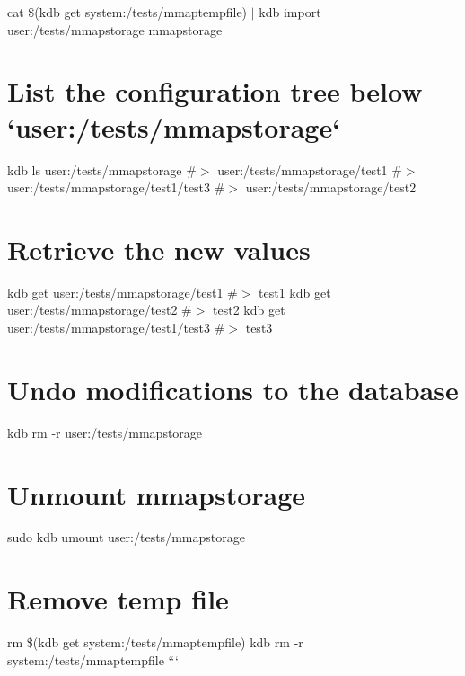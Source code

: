 cat \$(kdb get system\+:/tests/mmaptempfile) $\vert$ kdb import user\+:/tests/mmapstorage mmapstorage\hypertarget{autotoc_md417_autotoc_md434}{}\section{List the configuration tree below `user\+:/tests/mmapstorage`}\label{autotoc_md417_autotoc_md434}
kdb ls user\+:/tests/mmapstorage \#$>$ user\+:/tests/mmapstorage/test1 \#$>$ user\+:/tests/mmapstorage/test1/test3 \#$>$ user\+:/tests/mmapstorage/test2\hypertarget{autotoc_md417_autotoc_md435}{}\section{Retrieve the new values}\label{autotoc_md417_autotoc_md435}
kdb get user\+:/tests/mmapstorage/test1 \#$>$ test1 kdb get user\+:/tests/mmapstorage/test2 \#$>$ test2 kdb get user\+:/tests/mmapstorage/test1/test3 \#$>$ test3\hypertarget{autotoc_md417_autotoc_md436}{}\section{Undo modifications to the database}\label{autotoc_md417_autotoc_md436}
kdb rm -\/r user\+:/tests/mmapstorage\hypertarget{autotoc_md417_autotoc_md437}{}\section{Unmount mmapstorage}\label{autotoc_md417_autotoc_md437}
sudo kdb umount user\+:/tests/mmapstorage\hypertarget{autotoc_md417_autotoc_md438}{}\section{Remove temp file}\label{autotoc_md417_autotoc_md438}
rm \$(kdb get system\+:/tests/mmaptempfile) kdb rm -\/r system\+:/tests/mmaptempfile ``` 